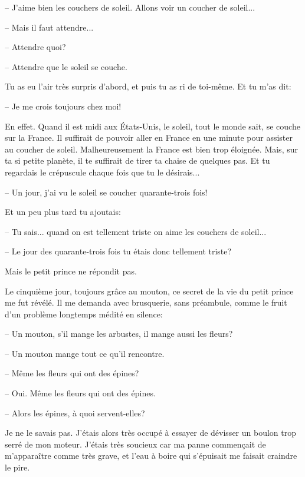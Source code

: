 \documentclass[a4paper]{report}
\begin{document}
-- J'aime bien les couchers de soleil. Allons voir un coucher de soleil...

-- Mais il faut attendre...

-- Attendre quoi?

-- Attendre que le soleil se couche.

Tu as eu l'air très surpris d'abord, et puis tu as ri de toi-même. Et tu m'as dit:

-- Je me crois toujours chez moi!

En effet. Quand il est midi aux États-Unis, le soleil, tout le monde sait, se couche sur la France. Il suffirait de pouvoir aller en France en une minute pour assister au coucher de soleil. Malheureusement la France est bien trop éloignée. Mais, sur ta si petite planète, il te suffirait de tirer ta chaise de quelques pas. Et tu regardais le crépuscule chaque fois que tu le désirais...

-- Un jour, j'ai vu le soleil se coucher quarante-trois fois!

Et un peu plus tard tu ajoutais:

-- Tu sais... quand on est tellement triste on aime les couchers de soleil...

-- Le jour des quarante-trois fois tu étais donc tellement triste?

Mais le petit prince ne répondit pas. 


\parachapter[VII]{} %
Le cinquième jour, toujours grâce au mouton, ce secret de la vie du petit prince me fut révélé. Il me demanda avec brusquerie, sans préambule, comme le fruit d'un problème longtemps médité en silence:

-- Un mouton, s'il mange les arbustes, il mange aussi les fleurs?

-- Un mouton mange tout ce qu'il rencontre.

-- Même les fleurs qui ont des épines?

-- Oui. Même les fleurs qui ont des épines.

-- Alors les épines, à quoi servent-elles?

Je ne le savais pas. J'étais alors très occupé à essayer de dévisser un boulon trop serré de mon moteur. J'étais très soucieux car ma panne commençait de m'apparaître comme très grave, et l'eau à boire qui s'épuisait me faisait craindre le pire.
\end{document}
